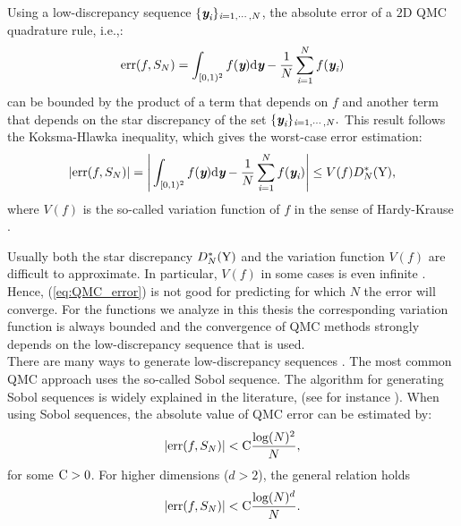 \begin{theorem} Using a low-discrepancy sequence $\{\textit{\textbf{y}}_{\textit{i}}\}_{\textit{i}=1, \cdots, N}$, the absolute error of a $2$D QMC quadrature rule, i.e.,:
\begin{equation}
\textrm{err}(f, S_{N}) =\int_{[0,1)^2}f(\textit{\textbf{y}}) \textrm{d}\textit{\textbf{y}}-\frac{1}{N}\sum_{\textit{i}=1}^{N}f(\textit{\textbf{y}}_{\textit{i}})
\end{equation}
can be bounded by the product of a term that depends on $f$ and another term that depends on the star discrepancy of the set $\{\textit{\textbf{y}}_{\textit{i}}\}_{\textit{i}=1, \cdots, N}.$ This result follows the Koksma-Hlawka inequality, which gives the worst-case error estimation:
\begin{equation}\label{eq:QMC_error}
|\textrm{err}(f, S_{N})|= \Bigg|\int_{[0,1)^2}f(\textit{\textbf{y}}) \textrm{d}\textit{\textbf{y}}-\frac{1}{N}\sum_{\textit{i}=1}^{N}f(\textit{\textbf{y}}_{\textit{i}})\Bigg|\leq V(f)D^*_N(\mbox{$\textup{Y}$}),
\end{equation}
where $V(f)$ is the so-called variation function of $f$ in the sense of Hardy-Krause \cite{brandolini2013koksma}. 
\end{theorem}
Usually both the star discrepancy $D^*_N(\mbox{$\textup{Y}$})$ and the variation function $V(f)$ are difficult to approximate. In particular,  $V(f)$ in some cases is even infinite \cite{wang2008low}. Hence, (\ref{eq:QMC_error}) is not good for predicting for which $N$ the error will converge. 
For the functions we analyze in this thesis the corresponding variation function is always bounded and the convergence of QMC methods strongly depends on the low-discrepancy sequence that is used.\\ \indent
There are many ways to generate low-discrepancy sequences \cite{dalal2008low}. The most common QMC approach uses the so-called Sobol sequence. The algorithm for generating Sobol sequences is widely explained in the literature, (see for instance \cite{bratley1988algorithm}). When using Sobol sequences, the absolute value of QMC error can be estimated by:
\begin{equation}
|\textrm{err}(f, S_{N})|<\textrm{C} \frac{\log(N)^2}{N}, 
\end{equation}
for some $\textrm{C}>0$.
For higher dimensions ($d>2$), the general relation holds
\begin{equation}
|\textrm{err}(f, S_N)|<\textrm{C} \frac{\log(N)^d}{N}.
\end{equation}
